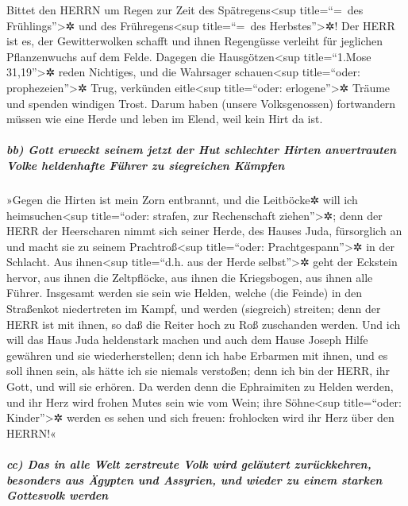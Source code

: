  Bittet den HERRN um Regen zur Zeit des
Spätregens\textless sup title=``=~des Frühlings''\textgreater✲ und des
Frühregens\textless sup title=``=~des Herbstes''\textgreater✲! Der HERR
ist es, der Gewitterwolken schafft und ihnen Regengüsse verleiht für
jeglichen Pflanzenwuchs auf dem Felde.  Dagegen die
Hausgötzen\textless sup title=``1.Mose 31,19''\textgreater✲ reden
Nichtiges, und die Wahrsager schauen\textless sup title=``oder:
prophezeien''\textgreater✲ Trug, verkünden eitle\textless sup
title=``oder: erlogene''\textgreater✲ Träume und spenden windigen Trost.
Darum haben (unsere Volksgenossen) fortwandern müssen wie eine Herde und
leben im Elend, weil kein Hirt da ist.

\hypertarget{bb-gott-erweckt-seinem-jetzt-der-hut-schlechter-hirten-anvertrauten-volke-heldenhafte-fuxfchrer-zu-siegreichen-kuxe4mpfen}{%
\subparagraph{bb) Gott erweckt seinem jetzt der Hut schlechter Hirten
anvertrauten Volke heldenhafte Führer zu siegreichen
Kämpfen}\label{bb-gott-erweckt-seinem-jetzt-der-hut-schlechter-hirten-anvertrauten-volke-heldenhafte-fuxfchrer-zu-siegreichen-kuxe4mpfen}}

 »Gegen die Hirten ist mein Zorn entbrannt, und die
Leitböcke✲ will ich heimsuchen\textless sup title=``oder: strafen, zur
Rechenschaft ziehen''\textgreater✲; denn der HERR der Heerscharen nimmt
sich seiner Herde, des Hauses Juda, fürsorglich an und macht sie zu
seinem Prachtroß\textless sup title=``oder: Prachtgespann''\textgreater✲
in der Schlacht.  Aus ihnen\textless sup title=``d.h. aus
der Herde selbst''\textgreater✲ geht der Eckstein hervor, aus ihnen die
Zeltpflöcke, aus ihnen die Kriegsbogen, aus ihnen alle Führer.
 Insgesamt werden sie sein wie Helden, welche (die Feinde)
in den Straßenkot niedertreten im Kampf, und werden (siegreich)
streiten; denn der HERR ist mit ihnen, so daß die Reiter hoch zu Roß
zuschanden werden.  Und ich will das Haus Juda heldenstark
machen und auch dem Hause Joseph Hilfe gewähren und sie
wiederherstellen; denn ich habe Erbarmen mit ihnen, und es soll ihnen
sein, als hätte ich sie niemals verstoßen; denn ich bin der HERR, ihr
Gott, und will sie erhören.  Da werden denn die
Ephraimiten zu Helden werden, und ihr Herz wird frohen Mutes sein wie
vom Wein; ihre Söhne\textless sup title=``oder: Kinder''\textgreater✲
werden es sehen und sich freuen: frohlocken wird ihr Herz über den
HERRN!«

\hypertarget{cc-das-in-alle-welt-zerstreute-volk-wird-geluxe4utert-zuruxfcckkehren-besonders-aus-uxe4gypten-und-assyrien-und-wieder-zu-einem-starken-gottesvolk-werden}{%
\subparagraph{cc) Das in alle Welt zerstreute Volk wird geläutert
zurückkehren, besonders aus Ägypten und Assyrien, und wieder zu einem
starken Gottesvolk
werden}\label{cc-das-in-alle-welt-zerstreute-volk-wird-geluxe4utert-zuruxfcckkehren-besonders-aus-uxe4gypten-und-assyrien-und-wieder-zu-einem-starken-gottesvolk-werden}}

